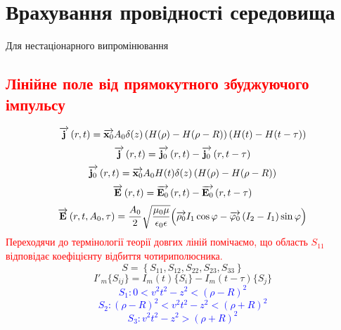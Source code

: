 \section{Врахування провідності середовища}

Для нестаціонарного випромінювання

\textcolor{red} {\section{Лінійне поле від прямокутного збуджуючого імпульсу}}
%
\begin{equation}
\overrightarrow{\mathbf j} \left( r, t \right) = \overrightarrow{\mathbf x_0} A_0 \delta(z) 
\left(  H(\rho) - H(\rho - R) \right) \left( H(t) - H(t-\tau) \right)
\end{equation}
%
\begin{equation}
\overrightarrow{\mathbf j} \left( r, t \right) = \overrightarrow{\mathbf j_0} \left( r, t \right) -
\overrightarrow{\mathbf j_0} \left( r, t - \tau \right)
\end{equation}
%
\textcolor{blue} { \begin{equation*}
\overrightarrow{\mathbf j_0} \left( r, t \right) = \overrightarrow{\mathbf x_0} A_0 H(t) \delta(z) 
\left(  H(\rho) - H(\rho - R) \right)
\end{equation*} }
%
\begin{equation}
\overrightarrow{\mathbf E} \left( r, t \right) = \overrightarrow{\mathbf E_0} \left( r, t \right) -
\overrightarrow{\mathbf E_0} \left( r, t - \tau \right)
\end{equation}
%
\begin{equation}
\overrightarrow{\mathbf E} \left( r, t, A_0, \tau \right) = \frac{A_0}{2} 
\sqrt{\frac{\mu_0 \mu}{\epsilon_0 \epsilon}}
\Big( \overrightarrow{\mathbf \rho_0} I_1 \cos \varphi - 
\overrightarrow{\mathbf \varphi_0} \left( I_2 - I_1 \right) \sin \varphi \Big)
\end{equation}
%
\textcolor{red} { Переходячи до термінології теорії довгих ліній помічаємо, 
що область $ S_{11} $ відповідає коефіцієнту відбиття чотириполюсника.}
%
\begin{equation}
S = \left\{ S_{11}, S_{12}, S_{22}, S_{23}, S_{33} \right\}
\end{equation}
%
\begin{equation}
I'_m \{S_{ij}\} = I_m (t) \{S_i\} - I_m (t-\tau) \{S_j\}
\end{equation}
%
\textcolor{blue} { \begin{equation*}
S_1: 0 < v^2 t^2 - z^2 < \left( \rho - R \right)^2
\end{equation*}
%
\begin{equation*}
S_2: \left( \rho - R \right)^2 < v^2 t^2 - z^2 < \left( \rho + R \right)^2
\end{equation*}
%
\begin{equation*}
S_3: v^2 t^2 - z^2 > \left( \rho + R \right)^2
\end{equation*} }
